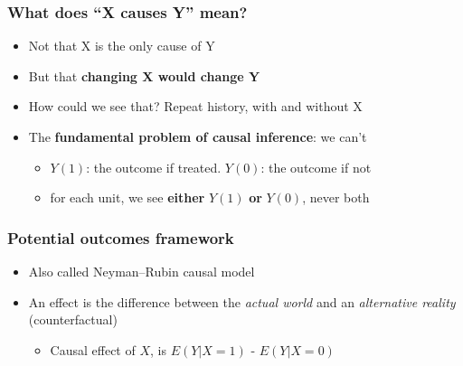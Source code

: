 \begin{frame}
\frametitle{What does ``X causes Y'' mean?}
\centering

\begin{itemize}[<+->]
  \item Not that X is the only cause of Y
  \item But that \textbf{changing X would change Y}
  \vspace{8pt}
  \item How could we see that? Repeat history, with and without X
  \vspace{8pt}
  \item The \textbf{fundamental problem of causal inference}: we can't
  \begin{itemize}
    \item $Y(1)$: the outcome if treated. $Y(0)$: the outcome if not
    \item for each unit, we see \textbf{either} $Y(1)$ \textbf{or} $Y(0)$, never both
  \end{itemize}
\end{itemize}

\end{frame}

\begin{frame}
\frametitle{Potential outcomes framework}
\centering

\begin{itemize}
  \item Also called Neyman–Rubin causal model
  \item An effect is the difference between the \textit{actual world} and an \textit{alternative reality} (counterfactual)
  \begin{itemize}
    \item Causal effect of $X$, is $E(Y|X = 1)$ - $E(Y|X = 0)$
  \end{itemize}
\end{itemize}

\end{frame}

